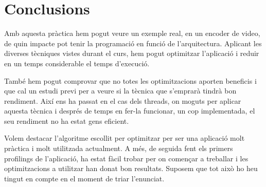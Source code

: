 \chapter{Conclusions}

Amb aquesta pràctica hem pogut veure un exemple real, en un encoder de video, de quin impacte pot tenir la programació en funció de l'arquitectura. Aplicant les diverses tècniques vistes durant el curs, hem pogut optimitzar l'aplicació i reduir en un temps considerable el temps d'execució.

També hem pogut comprovar que no totes les optimitzacions aporten beneficis i que cal un estudi previ per a veure si la tècnica que s'emprarà tindrà bon rendiment. Així ens ha passat en el cas dels threads, on moguts per aplicar aquesta tècnica i després de temps en fer-la funcionar, un cop implementada, el seu rendiment no ha estat gens eficient. 

Volem destacar l'algoritme escollit per optimitzar per ser una aplicació molt pràctica i molt utilitzada actualment. A més, de seguida fent els primers profilings de l'aplicació, ha estat fàcil trobar per on començar a treballar i les optimitzacions a utilitzar han donat bon resultats. Suposem que tot això ho heu tingut en compte en el moment de triar l'enunciat.

